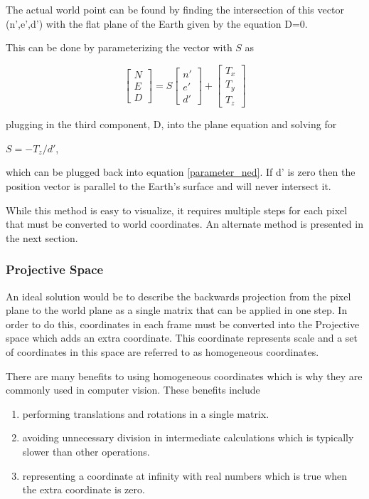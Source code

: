  The actual world point can be found by finding the intersection of this vector (n',e',d') with the flat plane of the Earth given by the equation D=0.  
 
 This can be done by parameterizing the vector with $S$ as 
 
 \begin{equation}
 \label{parameter_ned}
 \begin{bmatrix} N \\ E \\ D \end{bmatrix} =
 S \begin{bmatrix} n' \\ e' \\ d' \end{bmatrix}
 + \begin{bmatrix} T_x \\ T_y \\ T_z \end{bmatrix}
 \end{equation}
 
 plugging in the third component, D, into the plane equation and solving for
 \begin{center}
 $S = -T_z / d'$, 
 \end{center}
 which can be plugged back into equation \ref{parameter_ned}.  If d' is zero then the position vector is parallel to the Earth's surface and will never intersect it.   

 While this method is easy to visualize, it requires multiple steps for each pixel that must be converted to world coordinates.  An alternate method is presented in the next section.

 \subsubsection{Projective Space}
 
 An ideal solution would be to describe the backwards projection from the pixel plane to the world plane as a single matrix that can be applied in one step.  In order to do this, coordinates in each frame must be converted into the Projective space which adds an extra coordinate.  This coordinate represents scale and a set of coordinates in this space are referred to as homogeneous coordinates.

 There are many benefits to using homogeneous coordinates which is why they are commonly used in computer vision.  These benefits include
 \begin{enumerate}
 \item performing translations and rotations in a single matrix.
 \item avoiding unnecessary division in intermediate calculations which is typically slower than other operations.
 \item representing a coordinate at infinity with real numbers which is true when the extra coordinate is zero.
 \end{enumerate}
 
